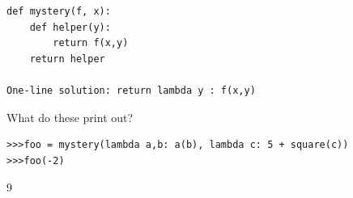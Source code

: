 \documentclass{exam}
\begin{document}
\begin{questions}
\begin{blocksection}
\begin{solution}[2in]
\begin{lstlisting}
def mystery(f, x):
    def helper(y):
        return f(x,y)
    return helper

One-line solution: return lambda y : f(x,y)
\end{lstlisting}
\end{solution}
\end{blocksection}

\question What do these print out?
\begin{lstlisting}
>>>foo = mystery(lambda a,b: a(b), lambda c: 5 + square(c))
>>>foo(-2)
\end{lstlisting}

\begin{solution}
9
\end{solution}

\end{questions}
\end{document}
